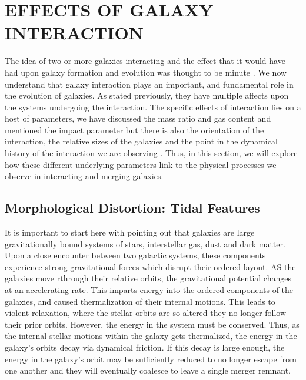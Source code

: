 \section{EFFECTS OF GALAXY INTERACTION}
The idea of two or more galaxies interacting and the effect that it would have had upon galaxy formation and evolution was thought to be minute \citep{Found this info in Chapter 8 of Binnie and Tremaine. Need to find a better source!}. We now understand that galaxy interaction plays an important, and fundamental role in the evolution of galaxies. As stated previously, they have multiple affects upon the systems undergoing the interaction. The specific effects of interaction lies on a host of parameters, we have discussed the mass ratio and gas content and mentioned the impact parameter but there is also the orientation of the interaction, the relative sizes of the galaxies and the point in the dynamical history of the interaction we are observing \citep{Some review paper, perhaps that states that these parameters are important}. Thus, in this section, we will explore how these different underlying parameters link to the physical processes we observe in interacting and merging galaxies.

\subsection{Morphological Distortion: Tidal Features}
\noindent It is important to start here with pointing out that galaxies are large gravitationally bound systems of stars, interstellar gas, dust and dark matter. Upon a close encounter between two galactic systems, these components experience strong gravitational forces which disrupt their ordered layout. AS the galaxies move rthrough their relative orbits, the gravitational potential changes at an accelerating rate. This imparts energy into the ordered components of the galaxies, and caused thermalization of their internal motions. This leads to violent relaxation, where the stellar orbits are so altered they no longer follow their prior orbits. However, the energy in the system must be conserved. Thus, as the internal stellar motions within the galaxy gets thermalized, the energy in the galaxy's orbits decay via dynamical friction. If this decay is large enough, the energy in the galaxy's orbit may be sufficiently reduced to no longer escape from one another and they will eventually coalesce to leave a single merger remnant. 

